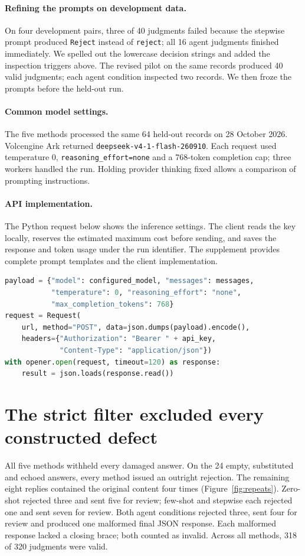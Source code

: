 \documentclass{article}
\begin{document}
\paragraph{Refining the prompts on development data.}
On four development pairs, three of 40 judgments failed because the stepwise prompt produced \texttt{Reject} instead of \texttt{reject}; all 16 agent judgments finished immediately. We spelled out the lowercase decision strings and added the inspection triggers above. The revised pilot on the same records produced 40 valid judgments; each agent condition inspected two records. We then froze the prompts before the held-out run.

\paragraph{Common model settings.}
The five methods processed the same 64 held-out records on 28 October 2026. Volcengine Ark returned \texttt{deepseek-v4-1-flash-260910}. Each request used temperature 0, \texttt{reasoning\_effort=none} and a 768-token completion cap; three workers handled the run. Holding provider thinking fixed allows a comparison of prompting instructions.

\paragraph{API implementation.}
The Python request below shows the inference settings. The client reads the key locally, reserves the estimated maximum cost before sending, and saves the response and token usage under the run identifier. The supplement provides complete prompt templates and the client implementation.
\begin{lstlisting}[language=Python]
payload = {"model": configured_model, "messages": messages,
           "temperature": 0, "reasoning_effort": "none",
           "max_completion_tokens": 768}
request = Request(
    url, method="POST", data=json.dumps(payload).encode(),
    headers={"Authorization": "Bearer " + api_key,
             "Content-Type": "application/json"})
with opener.open(request, timeout=120) as response:
    result = json.loads(response.read())
\end{lstlisting}

\section{The strict filter excluded every constructed defect}
All five methods withheld every damaged answer. On the 24 empty, substituted and echoed answers, every method issued an outright rejection. The remaining eight replies contained the original content four times (Figure~\ref{fig:repeats}). Zero-shot rejected three and sent five for review; few-shot and stepwise each rejected one and sent seven for review. Both agent conditions rejected three, sent four for review and produced one malformed final JSON response. Each malformed response lacked a closing brace; both counted as invalid. Across all methods, 318 of 320 judgments were valid.
\end{document}
